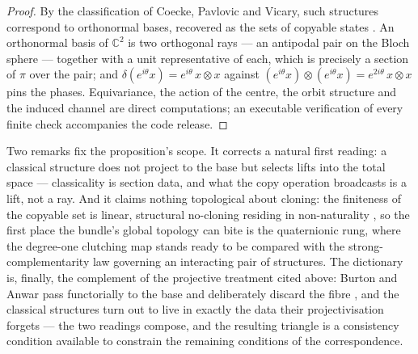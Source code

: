 \begin{proof}
By the classification of Coecke, Pavlovic and Vicary, such structures correspond to orthonormal
bases, recovered as the sets of copyable states \autocite{coeckepavlovicvicary2013orthogonal}.
An orthonormal basis of $\mathbb{C}^{2}$ is two orthogonal rays --- an antipodal pair on the
Bloch sphere --- together with a unit representative of each, which is precisely a section of
$\pi$ over the pair; and $\delta(e^{i\theta}x) = e^{i\theta}\, x \otimes x$ against
$(e^{i\theta}x) \otimes (e^{i\theta}x) = e^{2i\theta}\, x \otimes x$ pins the phases.
Equivariance, the action of the centre, the orbit structure and the induced channel are direct
computations; an executable verification of every finite check accompanies the code release.
\end{proof}

Two remarks fix the proposition's scope. It corrects a natural first reading: a classical
structure does not project to the base but selects lifts into the total space --- classicality
is section data, and what the copy operation broadcasts is a lift, not a ray. And it claims
nothing topological about cloning: the finiteness of the copyable set is linear, structural
no-cloning residing in non-naturality \autocite{abramskyheunen2012hstar}, so the first place the
bundle's global topology can bite is the quaternionic rung, where the degree-one clutching map
stands ready to be compared with the strong-complementarity law governing an interacting pair of
structures. The dictionary is, finally, the complement of the projective treatment cited above:
Burton and Anwar pass functorially to the base and deliberately discard the fibre
\autocite{burtonanwar2026meromorphic}, and the classical structures turn out to live in exactly
the data their projectivisation forgets --- the two readings compose, and the resulting triangle
is a consistency condition available to constrain the remaining conditions of the
correspondence.

